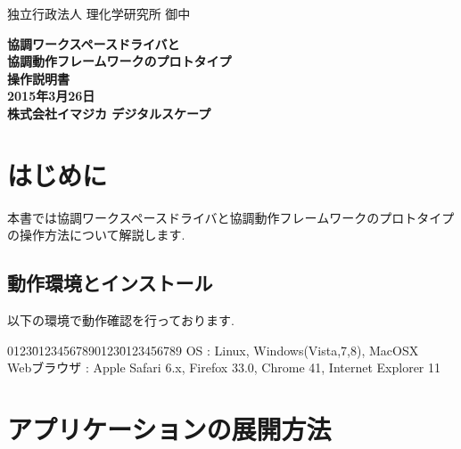 \documentclass[a4paper,10pt,oneside]{jsbook}
\begin{document}
\begin{titlepage}
\noindent
独立行政法人 理化学研究所 御中
\begin{center}
	\vspace{8cm}
	{\Huge \textbf{協調ワークスペースドライバと}} \\
	\vspace{1cm}
	{\Huge \textbf{協調動作フレームワークのプロトタイプ}} \\
	\vspace{1cm}
	{\Huge \textbf{操作説明書}} \\
	\vspace{10cm}
	{\Large \textbf{2015年3月26日}} \\
	\vspace{0.5cm}
	{\Large \textbf{株式会社イマジカ デジタルスケープ}}
\end{center}
\end{titlepage}



\tableofcontents

\chapter{はじめに}
本書では協調ワークスペースドライバと協調動作フレームワークのプロトタイプの操作方法について解説します.\\

\section{動作環境とインストール}
以下の環境で動作確認を行っております.\\

\begin{tabbing}
0123\=01234567890123\=0123456789\kill
\> OS \> : Linux, Windows(Vista,7,8), MacOSX \\
\> Webブラウザ \> :  Apple Safari 6.x, Firefox 33.0, Chrome 41, Internet Explorer 11
\end{tabbing}

\newpage

\chapter{アプリケーションの展開方法}
\end{document}

